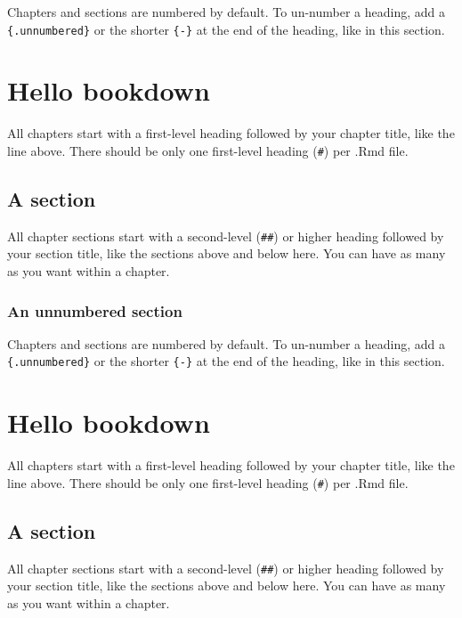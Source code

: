 \documentclass[
]{book}
\theoremstyle{definition}
\theoremstyle{definition}
\theoremstyle{definition}
\theoremstyle{definition}
\theoremstyle{remark}
\begin{document}
Chapters and sections are numbered by default. To un-number a heading, add a \texttt{\{.unnumbered\}} or the shorter \texttt{\{-\}} at the end of the heading, like in this section.

\hypertarget{hello-bookdown-6}{%
\chapter{Hello bookdown}\label{hello-bookdown-6}}

All chapters start with a first-level heading followed by your chapter title, like the line above. There should be only one first-level heading (\texttt{\#}) per .Rmd file.

\hypertarget{a-section-6}{%
\section{A section}\label{a-section-6}}

All chapter sections start with a second-level (\texttt{\#\#}) or higher heading followed by your section title, like the sections above and below here. You can have as many as you want within a chapter.

\hypertarget{an-unnumbered-section-6}{%
\subsection*{An unnumbered section}\label{an-unnumbered-section-6}}

Chapters and sections are numbered by default. To un-number a heading, add a \texttt{\{.unnumbered\}} or the shorter \texttt{\{-\}} at the end of the heading, like in this section.

\hypertarget{hello-bookdown-7}{%
\chapter{Hello bookdown}\label{hello-bookdown-7}}

All chapters start with a first-level heading followed by your chapter title, like the line above. There should be only one first-level heading (\texttt{\#}) per .Rmd file.

\hypertarget{a-section-7}{%
\section{A section}\label{a-section-7}}

All chapter sections start with a second-level (\texttt{\#\#}) or higher heading followed by your section title, like the sections above and below here. You can have as many as you want within a chapter.
\end{document}
